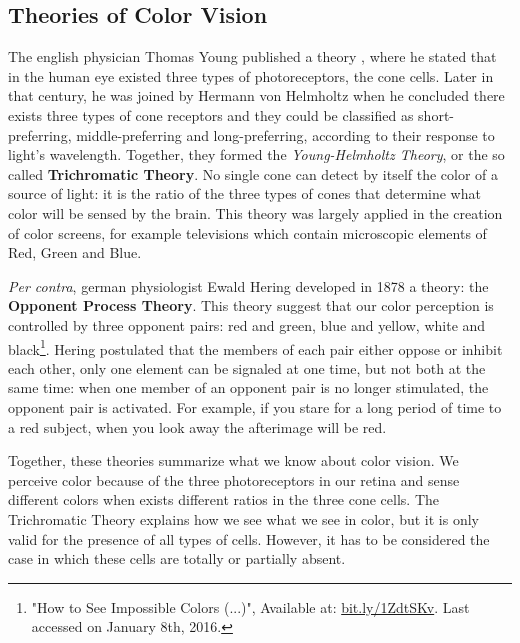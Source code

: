 \documentclass{report}
\begin{document}
\subsection{Theories of Color Vision}
The english physician Thomas Young published a theory \cite{Young1802}, where he stated that
in the human eye existed three types of photoreceptors, the cone cells. Later in that century, he was
joined by Hermann von Helmholtz when he concluded there exists three types of cone receptors and they could
be classified as short-preferring, middle-preferring and long-preferring, according to their response to
light’s wavelength. Together, they formed the \emph{Young-Helmholtz Theory}, or the so called \textbf{Trichromatic Theory}. 
No single cone can detect by itself the color of a source of light: it is the ratio of the three types of cones that
determine what color will be sensed by the brain. This theory was largely applied in the creation of color
screens, for example televisions which contain microscopic elements of Red, Green and Blue. \par
\emph{Per contra}, german physiologist Ewald Hering developed in 1878 a theory: the 
\textbf{Opponent Process Theory}. This theory suggest that our color perception is controlled by three
opponent pairs: red and green, blue and yellow, white and black\footnote{"How to See Impossible Colors (...)", Available at: \url{bit.ly/1ZdtSKv}. Last accessed on January 8th, 2016.}. Hering postulated that the members of each
pair either oppose or inhibit each other, only one element can be signaled at one time, but not both at the
same time: when one member of an opponent pair is no longer stimulated, the opponent pair is activated. For
example, if you stare for a long period of time to a red subject, when you look away the afterimage will be
red. \par
Together, these theories summarize what we know about color vision. We perceive color because of the three
photoreceptors in our retina and sense different colors when exists different ratios in the three cone
cells. The Trichromatic Theory explains how we see what we see in color, but it is only valid for the 
presence of all types of cells. However, it has to be considered the case in which these cells are totally or partially absent. 
%
\end{document}
